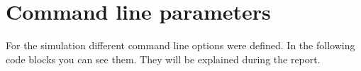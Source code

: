 \section{Command line parameters}

For the simulation different command line options were defined.
In the following code blocks you can see them.
They will be explained during the report.


